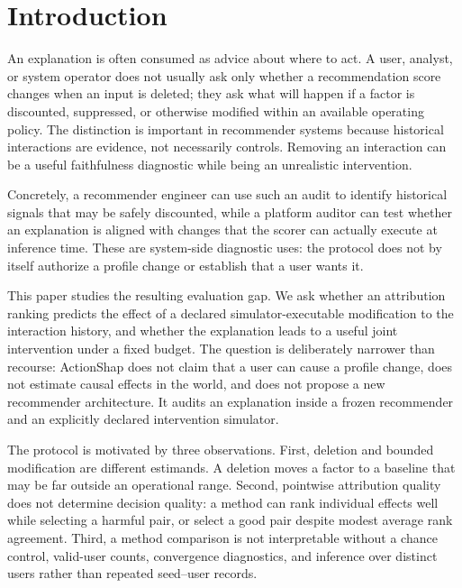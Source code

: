\documentclass[manuscript,screen,review,anonymous]{acmart}
\begin{document}
\maketitle


\section{Introduction}
An explanation is often consumed as advice about where to act. A user, analyst, or system operator does not usually ask only whether a recommendation score changes when an input is deleted; they ask what will happen if a factor is discounted, suppressed, or otherwise modified within an available operating policy. The distinction is important in recommender systems because historical interactions are evidence, not necessarily controls. Removing an interaction can be a useful faithfulness diagnostic while being an unrealistic intervention.

Concretely, a recommender engineer can use such an audit to identify historical signals that may be safely discounted, while a platform auditor can test whether an explanation is aligned with changes that the scorer can actually execute at inference time. These are system-side diagnostic uses: the protocol does not by itself authorize a profile change or establish that a user wants it.

This paper studies the resulting evaluation gap. We ask whether an attribution ranking predicts the effect of a declared simulator-executable modification to the interaction history, and whether the explanation leads to a useful joint intervention under a fixed budget. The question is deliberately narrower than recourse: ActionShap does not claim that a user can cause a profile change, does not estimate causal effects in the world, and does not propose a new recommender architecture. It audits an explanation inside a frozen recommender and an explicitly declared intervention simulator.

The protocol is motivated by three observations. First, deletion and bounded modification are different estimands. A deletion moves a factor to a baseline that may be far outside an operational range. Second, pointwise attribution quality does not determine decision quality: a method can rank individual effects well while selecting a harmful pair, or select a good pair despite modest average rank agreement. Third, a method comparison is not interpretable without a chance control, valid-user counts, convergence diagnostics, and inference over distinct users rather than repeated seed--user records.
\end{document}
